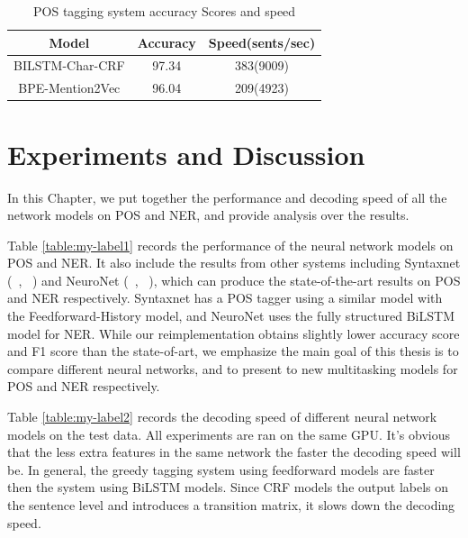 \documentclass{sfuthesis}
\begin{document}
\begin{table}[]
\centering
\caption{POS tagging system accuracy Scores and speed}
\label{table:pos-mention2vec}
\begin{tabular}{|c|c|c|}
\hline
Model            & Accuracy     & Speed(sents/sec)        \\ \hline
BILSTM-Char-CRF & 97.34  & 383(9009)                  \\ \hline
BPE-Mention2Vec      & 96.04  & 209(4923)                   \\ \hline
\end{tabular}
\end{table}



\chapter{Experiments and Discussion}

In this Chapter, we put together the performance and decoding speed of all the network models on POS and NER, and provide analysis over the results.

Table \ref{table:my-label1} records the performance of the neural network models on POS and NER. It also include the results from other systems including Syntaxnet (~\citeauthor{alberti2017syntaxnet}, ~\citeyear{alberti2017syntaxnet}) and NeuroNet (~\citeauthor{2017neuroner}, ~\citeyear{2017neuroner}), which can produce the state-of-the-art results on POS and NER respectively. Syntaxnet has a POS tagger using a similar model with the Feedforward-History model, and NeuroNet uses the fully structured BiLSTM model for NER. While our reimplementation obtains slightly lower accuracy score and F1 score than the state-of-art, we emphasize the main goal of this thesis is to compare different neural networks, and to present to new multitasking models for POS and NER respectively.

Table \ref{table:my-label2} records the decoding speed of different neural network models on the test data. All experiments are ran on the same GPU. It's obvious that the less extra features in the same network the faster the decoding speed will be. In general, the greedy tagging system using feedforward models are faster then the system using BiLSTM models. Since CRF models the output labels on the sentence level and introduces a transition matrix, it slows down the decoding speed.
\end{document}
